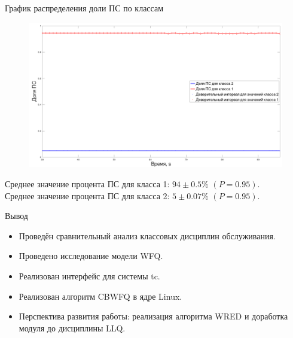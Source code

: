 \documentclass[12pt]{beamer}
\begin{document}
\begin{frame}{График распределения доли ПС по классам}
	\begin{figure}
		\center
    	\includegraphics[scale=0.255]{./plotnc.png}

	\end{figure}
	\begin{center}
		{\footnotesize 
		 Среднее значение процента  ПС для класса 1: $94 \pm 0.5 \%$ $(P = 0.95)$.\\
         Среднее значение процента  ПС для класса 2: $5 \pm 0.07 \%$ $(P = 0.95)$.
		}
	\end{center}
\end{frame}




\begin{frame}{Вывод}
	\begin{itemize}
		\item Проведён сравнительный анализ классовых дисциплин обслуживания.
		\item Проведено исследование модели WFQ.
		\item Реализован интерфейс для системы tc.
		\item Реализован алгоритм CBWFQ в ядре Linux.
		\item Перспектива развития работы: реализация алгоритма WRED и доработка модуля до дисциплины LLQ.
	\end{itemize}
\end{frame}

\itmothankyou
\end{document}
